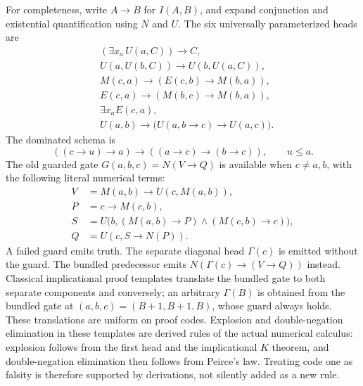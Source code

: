 For completeness, write $A\to B$ for $I(A,B)$, and expand conjunction
and existential quantification using $N$ and $U$. The six universally
parameterized heads are
\[
\begin{aligned}
 &(\exists x_a\,U(a,C))\to C,\\
 &U(a,U(b,C))\to U(b,U(a,C)),\\
 &M(c,a)\to(E(c,b)\to M(b,a)),\\
 &E(c,a)\to(M(b,c)\to M(b,a)),\\
 &\exists x_a E(c,a),\\
 &U(a,b)\to\bigl(U(a,b\to c)\to U(a,c)\bigr).
\end{aligned}
\]
The dominated schema is
\[
 ((c\to u)\to a)\to((a\to c)\to(b\to c)),\qquad u\le a.
\]
The old guarded gate $G(a,b,c)=N(V\to Q)$ is available when $c\ne a,b$,
with the following literal numerical terms:
\[
\begin{aligned}
 V&=M(a,b)\to U(c,M(a,b)),\\
 P&=c\to M(c,b),\\
 S&=U\bigl(b,(M(a,b)\to P)\wedge(M(c,b)\to c)\bigr),\\
 Q&=U(c,S\to N(P)).
\end{aligned}
\]
A failed guard emits truth. The separate diagonal head $\Gamma(c)$ is
emitted without the guard. The bundled predecessor emits
$N(\Gamma(c)\to(V\to Q))$ instead. Classical implicational proof templates
translate the bundled gate to both separate components and conversely;
an arbitrary $\Gamma(B)$ is obtained from the bundled gate at
$(a,b,c)=(B+1,B+1,B)$, whose guard always holds. These translations are
uniform on proof codes. Explosion and double-negation elimination in
these templates are derived rules of the actual numerical calculus:
explosion follows from the first head and the implicational $K$ theorem,
and double-negation elimination then follows from Peirce's law. Treating
code one as falsity is therefore supported by derivations, not silently
added as a new rule.

